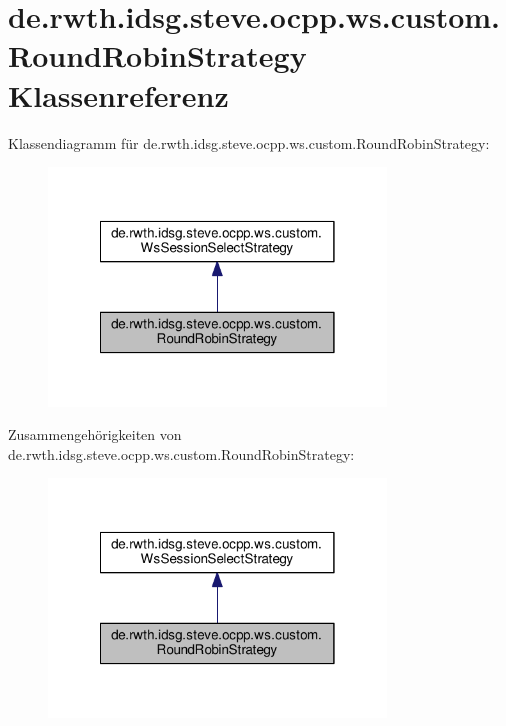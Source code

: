 \hypertarget{classde_1_1rwth_1_1idsg_1_1steve_1_1ocpp_1_1ws_1_1custom_1_1_round_robin_strategy}{\section{de.\-rwth.\-idsg.\-steve.\-ocpp.\-ws.\-custom.\-Round\-Robin\-Strategy Klassenreferenz}
\label{classde_1_1rwth_1_1idsg_1_1steve_1_1ocpp_1_1ws_1_1custom_1_1_round_robin_strategy}
}


Klassendiagramm für de.\-rwth.\-idsg.\-steve.\-ocpp.\-ws.\-custom.\-Round\-Robin\-Strategy\-:\nopagebreak
\begin{figure}[H]
\begin{center}
\leavevmode
\includegraphics[width=254pt]{classde_1_1rwth_1_1idsg_1_1steve_1_1ocpp_1_1ws_1_1custom_1_1_round_robin_strategy__inherit__graph}
\end{center}
\end{figure}


Zusammengehörigkeiten von de.\-rwth.\-idsg.\-steve.\-ocpp.\-ws.\-custom.\-Round\-Robin\-Strategy\-:\nopagebreak
\begin{figure}[H]
\begin{center}
\leavevmode
\includegraphics[width=254pt]{classde_1_1rwth_1_1idsg_1_1steve_1_1ocpp_1_1ws_1_1custom_1_1_round_robin_strategy__coll__graph}
\end{center}
\end{figure}
